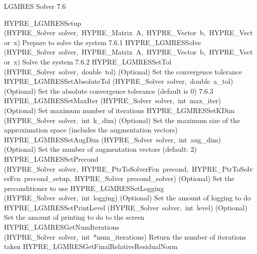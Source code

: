 \documentclass{article}
\begin{document}
\begin{cxxentry}
\begin{cxxentry}
\begin{cxxfunction}
\begin{cxxdoc}
\end{cxxdoc}
\end{cxxfunction}
\end{cxxentry}
\begin{cxxentry}
{}
        {LGMRES Solver}
        {}
        {
}
        {7.6}
\begin{cxxnames}
        {HYPRE\_LGMRESSetup}
        {(HYPRE\_Solver\ solver,\ HYPRE\_Matrix\ A,\ HYPRE\_Vector\ b,\ HYPRE\_Vector\ x)}
        {
Prepare to solve the system}
        {7.6.1}
        {HYPRE\_LGMRESSolve}
        {(HYPRE\_Solver\ solver,\ HYPRE\_Matrix\ A,\ HYPRE\_Vector\ b,\ HYPRE\_Vector\ x)}
        {
Solve the system}
        {7.6.2}
        {HYPRE\_LGMRESSetTol}
        {(HYPRE\_Solver\ solver,\ double\ tol)}
        {
(Optional) Set the convergence tolerance}
        {}
\label{cxx.7.6.4}
        {HYPRE\_LGMRESSetAbsoluteTol}
        {(HYPRE\_Solver\ solver,\ double\ a\_tol)}
        {
(Optional) Set the absolute convergence tolerance (default is 0)}
        {7.6.3}
        {HYPRE\_LGMRESSetMaxIter}
        {(HYPRE\_Solver\ solver,\ int\ max\_iter)}
        {
(Optional) Set maximum number of iterations}
        {}
\label{cxx.7.6.5}
        {HYPRE\_LGMRESSetKDim}
        {(HYPRE\_Solver\ solver,\ int\ k\_dim)}
        {
(Optional) Set the maximum size of the approximation space
(includes the augmentation vectors)}
        {}
\label{cxx.7.6.6}
        {HYPRE\_LGMRESSetAugDim}
        {(HYPRE\_Solver\ solver,\ int\ aug\_dim)}
        {
(Optional) Set the number of augmentation vectors  (default: 2)}
        {}
\label{cxx.7.6.7}
        {HYPRE\_LGMRESSetPrecond}
        {(HYPRE\_Solver\ solver,\ HYPRE\_PtrToSolverFcn\ precond,\ HYPRE\_PtrToSolverFcn\ precond\_setup,\ HYPRE\_Solver\ precond\_solver)}
        {
(Optional) Set the preconditioner to use}
        {}
\label{cxx.7.6.8}
        {HYPRE\_LGMRESSetLogging}
        {(HYPRE\_Solver\ solver,\ int\ logging)}
        {
(Optional) Set the amount of logging to do}
        {}
\label{cxx.7.6.9}
        {HYPRE\_LGMRESSetPrintLevel}
        {(HYPRE\_Solver\ solver,\ int\ level)}
        {
(Optional) Set the amount of printing to do to the screen}
        {}
\label{cxx.7.6.10}
        {HYPRE\_LGMRESGetNumIterations}
        {(HYPRE\_Solver\ solver,\ int\ *num\_iterations)}
        {
Return the number of iterations taken}
        {}
\label{cxx.7.6.11}
        {HYPRE\_LGMRESGetFinalRelativeResidualNorm}

\end{cxxnames}
\end{cxxentry}
\end{cxxentry}
\end{document}
